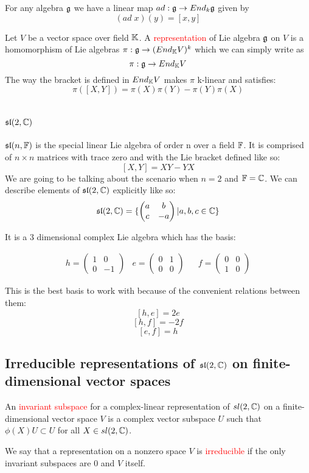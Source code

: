 \documentclass{article}
\begin{document}
For any algebra $\mathfrak{g}$ we have a linear map $ad:\mathfrak{g}\rightarrow End_k\mathfrak{g}$ given by $$(ad\; x)(y)=[x,y]$$

\begin{definition} Let $V$ be a vector space over field $\mathbb{K}$. A \textcolor{red}{representation} of Lie algebra $\mathfrak{g}$ on $V$ is a homomorphism of Lie algebras $\pi:\mathfrak{g}\rightarrow(End_{\mathbb{K}}V)^{k}$ which we can simply write as 
$$\pi:\mathfrak{g}\rightarrow End_{\mathbb{K}}V$$
The way the bracket is defined in $End_{\mathbb{K}}V$ makes $\pi$ k-linear and satisfies:
$$\pi([X,Y])=\pi(X)\pi(Y)-\pi(Y)\pi(X) $$

\end{definition}
\section{$\mathfrak{sl}(2,\mathbb{C})$}
$\mathfrak{sl}(n,\mathbb{F})$ is the special linear Lie algebra of order n over a field $\mathbb{F}$. It is comprised of $n\times n$ matrices with trace zero and with the Lie bracket defined like so:
$$[X,Y]=XY-YX $$
We are going to be talking about the scenario when $n=2$ and $\mathbb{F}=\mathbb{C}$. We can describe elements of $\mathfrak{sl}(2,\mathbb{C})$ explicitly like so:
$$\mathfrak{sl}(2,\mathbb{C})=\{\begin{pmatrix}
a & b \\
c & -a 
\end{pmatrix}| a,b,c\in \mathbb{C}\}$$

It is a 3 dimensional complex Lie algebra which has the basis:

\begin{align*}
&
h=\begin{pmatrix}
1 & 0\\
0 & -1 
\end{pmatrix} 
&
e=\begin{pmatrix}
0 & 1\\
0 & 0 
\end{pmatrix}
&
&
f=\begin{pmatrix}
0 & 0\\
1 & 0 
\end{pmatrix}
&
\end{align*}

This is the best basis to work with because of the convenient relations between them:\\
$$[h,e]=2e $$
$$[h,f]=-2f $$
$$[e,f]=h $$

\subsection{Irreducible representations of $\mathfrak{sl}(2,\mathbb{C})$ on finite-dimensional vector spaces}
\begin{definition}An \textcolor{red}{invariant subspace} for a complex-linear representation of $sl(2,\mathbb{C})$ on a finite-dimensional vector space $V$ is a complex vector subspace $U$ such that $\phi(X)U\subset U$ for all $X\in sl(2,\mathbb{C})$.
\end{definition}
\begin{definition}We say that a representation on a nonzero space $V$ is \textcolor{red}{irreducible} if the only invariant subspaces are 0 and $V$ itself.
\end{definition}
\end{document}
